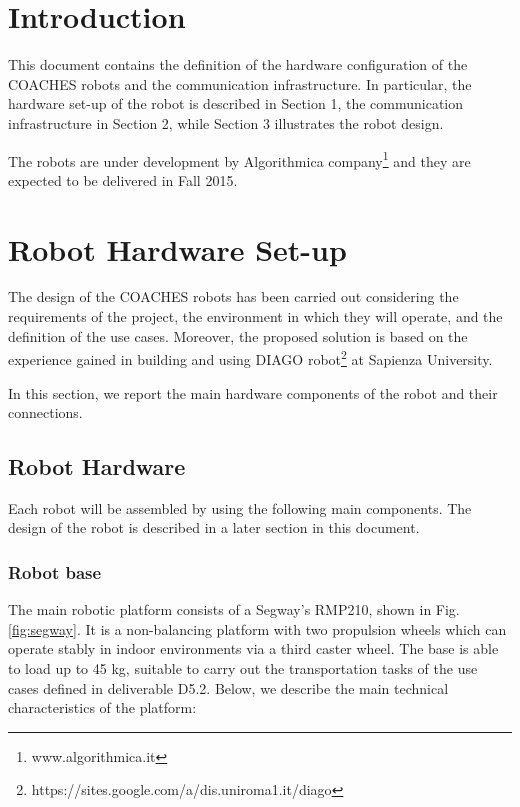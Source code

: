 \section*{Introduction}

This document contains the definition of the hardware configuration of the COACHES robots and the communication infrastructure. In particular, the hardware set-up of the robot is described in Section 1, the communication infrastructure in Section 2, while Section 3 illustrates the robot design.

The robots are under development by Algorithmica company\footnote{www.algorithmica.it} and they are expected to be delivered in Fall 2015.


\section{Robot Hardware Set-up}

The design of the COACHES robots has been carried out considering the requirements of the project, the environment in which they will operate, and the definition of the use cases.
Moreover, the proposed solution is based on the experience gained in building and using DIAGO robot\footnote{https://sites.google.com/a/dis.uniroma1.it/diago} at Sapienza University.

In this section, we report the main hardware components of the robot and their connections.


\subsection{Robot Hardware}

Each robot will be assembled by using the following main components.
The design of the robot is described in a later section in this document.


\subsubsection{Robot base}
The main robotic platform consists of a Segway's RMP210, shown in Fig. \ref{fig:segway}.
It is a non-balancing platform with two propulsion wheels which can operate stably in indoor environments via a third caster wheel. The base is able to load up to 45 kg, suitable to carry out the transportation tasks of the use cases defined in deliverable D5.2. Below, we describe the main technical characteristics of the platform:

